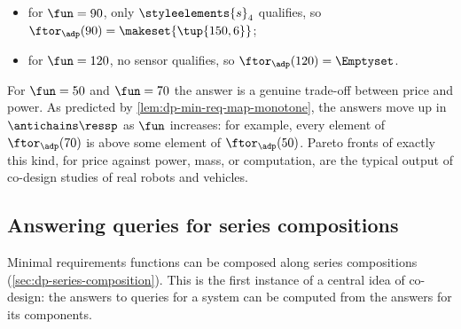 \begin{example}
\begin{itemize}
        \item for $\fun = 90$, only $\styleelements{s}_4$ qualifies, so $\ftor_{\adp}(90) = \makeset{\tup{150, 6}}$;
        \item for $\fun = 120$, no sensor qualifies, so $\ftor_{\adp}(120) = \Emptyset$.
    \end{itemize}
    For $\fun = 50$ and $\fun = 70$ the answer is a genuine trade-off between price and power.
    As predicted by \cref{lem:dp-min-req-map-monotone}, the answers move up in $\antichains \ressp$ as $\fun$ increases: for example, every element of $\ftor_{\adp}(70)$ is above some element of $\ftor_{\adp}(50)$.
    Pareto fronts of exactly this kind, for price against power, mass, or computation, are the typical output of co-design studies of real robots and vehicles.
\end{example}

\subsection{Answering queries for series compositions}

Minimal requirements functions can be composed along series compositions (\cref{sec:dp-series-composition}).
This is the first instance of a central idea of co-design: the answers to queries for a system can be computed from the answers for its components.

